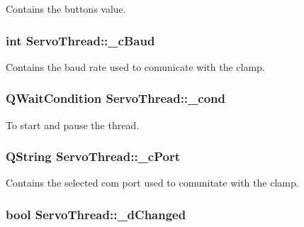 Contains the buttons value. 

\hypertarget{class_servo_thread_a9fccfd415e2e55c8abef7fcc6535af30}{}
\subsubsection[{\+\_\+c\+Baud}]{\setlength{\rightskip}{0pt plus 5cm}int Servo\+Thread\+::\+\_\+c\+Baud\hspace{0.3cm}{\ttfamily [private]}}\label{class_servo_thread_a9fccfd415e2e55c8abef7fcc6535af30}


Contains the baud rate used to comunicate with the clamp. 

\hypertarget{class_servo_thread_afcb93c09acd7fecf47d92996a297365c}{}
\subsubsection[{\+\_\+cond}]{\setlength{\rightskip}{0pt plus 5cm}Q\+Wait\+Condition Servo\+Thread\+::\+\_\+cond\hspace{0.3cm}{\ttfamily [private]}}\label{class_servo_thread_afcb93c09acd7fecf47d92996a297365c}


To start and pause the thread. 

\hypertarget{class_servo_thread_ab52437b31a433c427a6c050f2b1cc959}{}
\subsubsection[{\+\_\+c\+Port}]{\setlength{\rightskip}{0pt plus 5cm}Q\+String Servo\+Thread\+::\+\_\+c\+Port\hspace{0.3cm}{\ttfamily [private]}}\label{class_servo_thread_ab52437b31a433c427a6c050f2b1cc959}


Contains the selected com port used to comunitate with the clamp. 

\hypertarget{class_servo_thread_a2b6ccfeacbb3cc9ac5c34549b9aa3f11}{}
\subsubsection[{\+\_\+d\+Changed}]{\setlength{\rightskip}{0pt plus 5cm}bool Servo\+Thread\+::\+\_\+d\+Changed\hspace{0.3cm}{\ttfamily [private]}}\label{class_servo_thread_a2b6ccfeacbb3cc9ac5c34549b9aa3f11}


